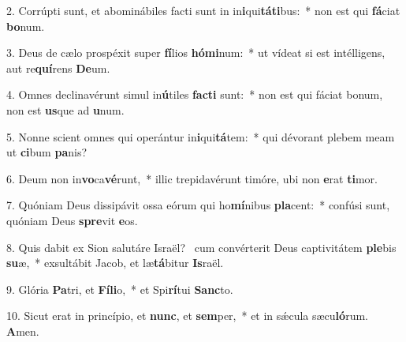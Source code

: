 2. Corrúpti sunt, et abominábiles facti sunt in in\textbf{i}qui\textbf{tá}\textbf{ti}bus:~*  non est qui \textbf{fá}ciat \textbf{bo}num.\

3. Deus de cælo prospéxit super \textbf{fí}lios \textbf{hó}\textbf{mi}num:~*  ut vídeat si est intélligens, aut re\textbf{quí}rens \textbf{De}um.\

4. Omnes declinavérunt simul in\textbf{ú}tiles \textbf{fac}\textbf{ti} sunt:~*  non est qui fáciat bonum, non est \textbf{us}que ad \textbf{u}num.\

5. Nonne scient omnes qui operántur in\textbf{i}qui\textbf{tá}tem:~*  qui dévorant plebem meam ut \textbf{ci}bum \textbf{pa}nis?\

6. Deum non in\textbf{vo}ca\textbf{vé}runt,~*  illic trepidavérunt timóre, ubi non \textbf{e}rat \textbf{ti}mor.\

7. Quóniam Deus dissipávit ossa eórum qui ho\textbf{mí}nibus \textbf{pla}cent:~*  confúsi sunt, quóniam Deus \textbf{spre}vit \textbf{e}os.\

8. Quis dabit ex Sion salutáre Israël? \dag\  cum convérterit Deus captivitátem \textbf{ple}bis \textbf{su}æ,~*  exsultábit Jacob, et læ\textbf{tá}bitur \textbf{Is}raël.\

9. Glória \textbf{Pa}tri, et \textbf{Fí}\textbf{li}o,~*  et Spi\textbf{rí}tui \textbf{Sanc}to.\

10. Sicut erat in princípio, et \textbf{nunc}, et \textbf{sem}per,~*  et in sǽcula sæcu\textbf{ló}rum. \textbf{A}men.\


